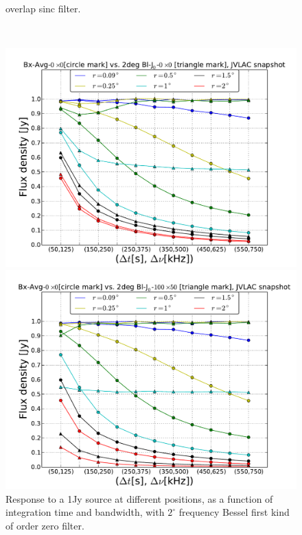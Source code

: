 \documentclass[useAMS,usenatbib]{mn2e}
\begin{document}
\begin{figure}
\begin{minipage}{0.38\linewidth}
{ overlap sinc filter.}
    \label{fig:max-integ-timefreq-sinc-w100x50-fov2}\end{minipage}\\
\begin{minipage}{0.38\linewidth}\includegraphics[width=1\textwidth]{./Figures/max-integ-timefreq-bessel-w1x1-fov2.pdf}
      \caption{Response to a 1Jy source at different positions, as a function of integration time and bandwidth, with $2^{\circ}$ frequency 
Bessel first kind of order zero filter.}
      \label{fig:max-integ-timefreq-bessel-w1x1-fov2}\end{minipage}
\hspace{1cm}
\begin{minipage}{0.38\linewidth}\includegraphics[width=1\textwidth]{./Figures/max-integ-timefreq-bessel-w100x50-fov2.pdf}

\end{minipage}
\end{figure}
\end{document}
